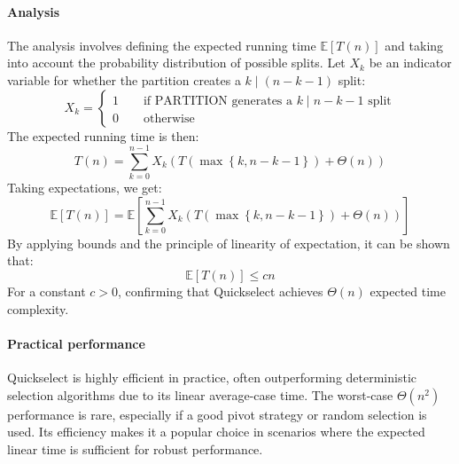 \paragraph*{Analysis}
The analysis involves defining the expected running time $\mathbb{E}[T(n)]$ and taking into account the probability distribution of possible splits.
Let $X_k$ be an indicator variable for whether the partition creates a $k\mid(n-k-1)$ split:
\[X_k=\begin{cases}  1 \qquad \text{if PARTITION generates a } k \mid n-k-1\text{ split} \\ 0 \qquad\text{otherwise} \end{cases}\]
The expected running time is then:
\[T(n)=\sum_{k=0}^{n-1}X_k\left(T\left(\max\left\{k, n - k -1\right\}\right)+\Theta(n)\right)\]
Taking expectations, we get:
\[\mathbb{E}[T(n)]=\mathbb{E}\left[\sum_{k=0}^{n-1}X_k\left(T\left(\max\left\{k, n - k -1\right\}\right)+\Theta(n)\right)\right]\]
By applying bounds and the principle of linearity of expectation, it can be shown that:
\[\mathbb{E}[T(n)] \leq c n\]  
For a constant $c > 0$, confirming that Quickselect achieves $\Theta(n)$ expected time complexity.

\paragraph*{Practical performance}
Quickselect is highly efficient in practice, often outperforming deterministic selection algorithms due to its linear average-case time.
The worst-case $\Theta(n^2)$ performance is rare, especially if a good pivot strategy or random selection is used. 
Its efficiency makes it a popular choice in scenarios where the expected linear time is sufficient for robust performance.

